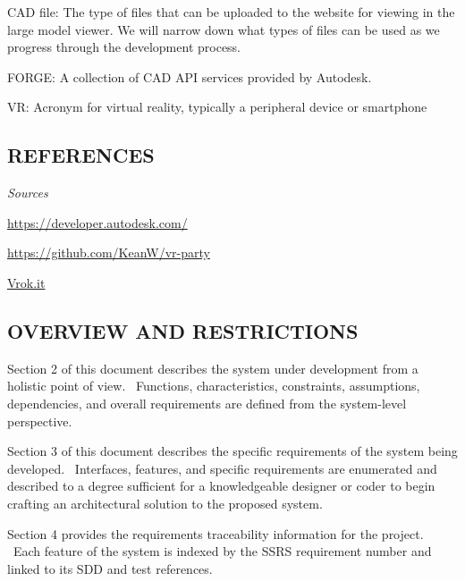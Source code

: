 \documentclass[letterpaper, 10pt, draftclsnofoot, onecolumn]{IEEEtran}
\begin{document}
{\color{black}
	CAD file: The type of files that can be uploaded to the website for viewing in the large model viewer.
	We will  narrow down what types of files can be used as we progress through the development process.
}

{\color{black}
	FORGE: A collection of CAD API services provided by Autodesk.
}

{\color{black}
	VR: Acronym for virtual reality, typically a peripheral device or smartphone
}


\subsection[REFERENCES]{\rmfamily\bfseries\color{black}
REFERENCES}
{\itshape\color{black}
Sources}
{\color{black}

\url{https://developer.autodesk.com/}

\url{https://github.com/KeanW/vr-party}

\url{Vrok.it}
}

\subsection[OVERVIEW AND
RESTRICTIONS]{\rmfamily\bfseries\color{black}
OVERVIEW AND RESTRICTIONS}
{\itshape\color{black}
}
{\color{black}
}


\bigskip

{\color{black}
Section 2 of this document describes the system under development from a
holistic point of view. \ Functions, characteristics, constraints,
assumptions, dependencies, and overall requirements are defined from
the system-level perspective.}


\bigskip

{\color{black}
Section 3 of this document describes the specific requirements of the
system being developed. \ Interfaces, features, and specific
requirements are enumerated and described to a degree sufficient for a
knowledgeable designer or coder to begin crafting an architectural
solution to the proposed system.}


\bigskip

{\color{black}
Section 4 provides the requirements traceability information for the
project. \ Each feature of the system is indexed by the SSRS
requirement number and linked to its SDD and test references.}
\end{document}
